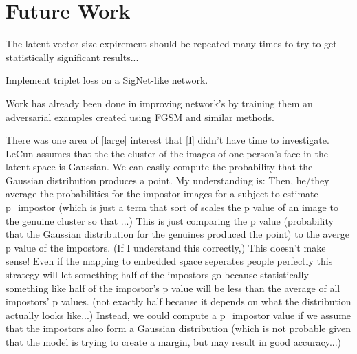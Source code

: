 \section{Future Work}\label{sec:future_work}

The latent vector size expirement should be repeated many times to try to get statistically significant results...

Implement triplet loss on a SigNet-like network.

Work has already been done in improving network's by training them an adversarial examples created using FGSM and similar methods.

There was one area of [large] interest that [I] didn't have time to investigate.
LeCun assumes that the the cluster of the images of one person's face in the latent space is Gaussian.
We can easily compute the probability that the Gaussian distribution produces a point.
My understanding is:
Then, he/they average the probabilities for the impostor images for a subject to estimate p\_impostor (which is just a term that sort of scales the p value of an image to the genuine cluster so that ...)
This is just comparing the p value (probability that the Gaussian distribution for the genuines produced the point) to the averge p value of the impostors.
(If I understand this correctly,) This doesn't make sense!
Even if the mapping to embedded space seperates people perfectly this strategy will let something half of the impostors go because statistically something like half of the impostor's p value will be less than the average of all impostors' p values.
(not exactly half because it depends on what the distribution actually looks like...)
Instead, we could compute a p\_impostor value if we assume that the impostors also form a Gaussian distribution (which is not probable given that the model is trying to create a margin, but may result in good accuracy...)

